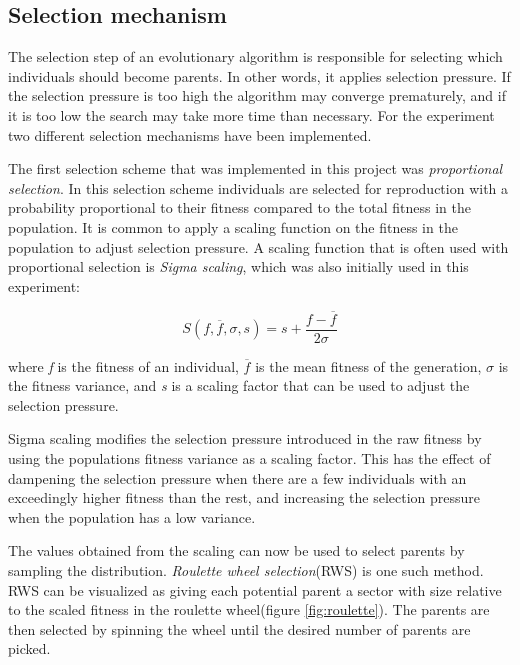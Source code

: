 \subsection{Selection mechanism}
The selection step of an evolutionary algorithm is responsible for selecting which individuals should become parents.
In other words, it applies selection pressure.
If the selection pressure is too high the algorithm may converge prematurely, and if it is too low the search may take more time than necessary.
For the experiment two different selection mechanisms have been implemented.
		
The first selection scheme that was implemented in this project was \emph{proportional selection}.
In this selection scheme individuals are selected for reproduction with a probability proportional to their fitness compared to the total fitness in the population.
It is common to apply a scaling function on the fitness in the population to adjust selection pressure.
A scaling function that is often used with proportional selection is \emph{Sigma scaling}\cite{goh_sexual_2003}, which was also initially used in this experiment:
		
\begin{equation}
		S(f, \overline{f}, \sigma, s) = s + \frac{f - \overline{f} }{2\sigma}
\end{equation}
		
where \emph{f} is the fitness of an individual, $\overline{f}$ is the mean fitness of the generation, $\sigma$ is the fitness variance, and \emph{s} is a scaling factor that can be used to adjust the selection pressure.
		
Sigma scaling modifies the selection pressure introduced in the raw fitness by using the populations fitness variance as a scaling factor.
This has the effect of dampening the selection pressure when there are a few individuals with an exceedingly higher fitness than the rest, and increasing the selection pressure when the population has a low variance.
		
The values obtained from the scaling can now be used to select parents by sampling the distribution.
\emph{Roulette wheel selection}(RWS)\cite{goh_sexual_2003}  is one such method.
RWS can be visualized as giving each potential parent a sector with size relative to the scaled fitness in the roulette wheel(figure \ref{fig:roulette}).
The parents are then selected by spinning the wheel until the desired number of parents are picked.
		
